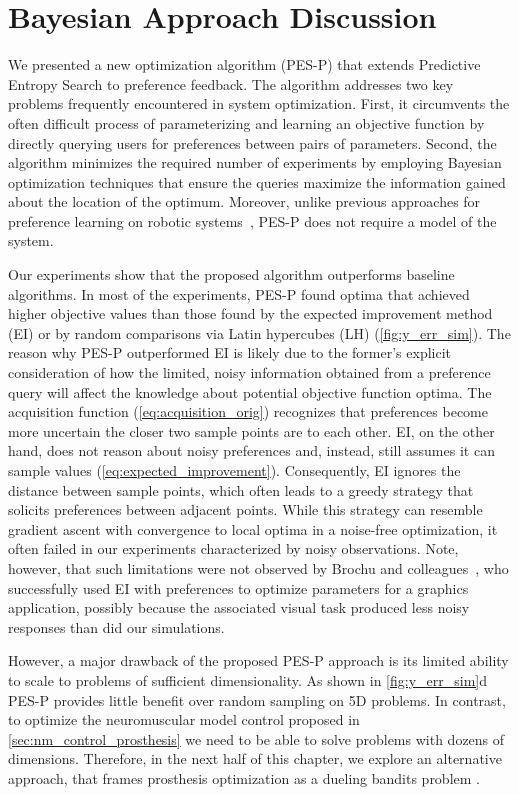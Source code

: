 \section{Bayesian Approach Discussion}\label{sec:bayes_discussion}
We presented a new optimization algorithm (PES-P) that extends Predictive
Entropy Search to preference feedback. The algorithm addresses two key problems
frequently encountered in system optimization. First, it circumvents the often
difficult process of parameterizing and learning an objective function by
directly querying users for preferences between pairs of parameters. Second, the
algorithm minimizes the required number of experiments by employing Bayesian
optimization techniques that ensure the queries maximize the information gained
about the location of the optimum. Moreover, unlike previous approaches for
preference learning on robotic systems~\citep{wilson2012bayesian,
jain2013learning}, PES-P does not require a model of the system.

Our experiments show that the proposed algorithm outperforms baseline
algorithms. In most of the experiments, PES-P found optima that achieved higher
objective values than those found by the expected improvement method (EI) or by
random comparisons via Latin hypercubes (LH) (\cref{fig:y_err_sim}). The reason
why PES-P outperformed EI is likely due to the former's explicit consideration
of how the limited, noisy information obtained from a preference query will
affect the knowledge about potential objective function optima. The acquisition
function (\cref{eq:acquisition_orig}) recognizes that preferences become more
uncertain the closer two sample points are to each other. EI, on the other hand,
does not reason about noisy preferences and, instead, still assumes it can
sample values (\cref{eq:expected_improvement}). Consequently, EI ignores the
distance between sample points, which often leads to a greedy strategy that
solicits preferences between adjacent points. While this strategy can resemble
gradient ascent with convergence to local optima in a noise-free optimization,
it often failed in our experiments characterized by noisy observations. Note,
however, that such limitations were not observed by Brochu and
colleagues~\citep{eric2008active}, who successfully used EI with preferences to
optimize parameters for a graphics application, possibly because the associated
visual task produced less noisy responses than did our simulations. 

However, a major drawback of the proposed PES-P approach is its limited ability
to scale to problems of sufficient dimensionality. As shown in
\cref{fig:y_err_sim}d PES-P provides little benefit over random sampling on 5D
problems. In contrast, to optimize the neuromuscular model control proposed in
\cref{sec:nm_control_prosthesis} we need to be able to solve problems with
dozens of dimensions. Therefore, in the next half of this chapter, we explore an
alternative approach, that frames prosthesis optimization as a dueling bandits
problem \citep{yue2012k}.
